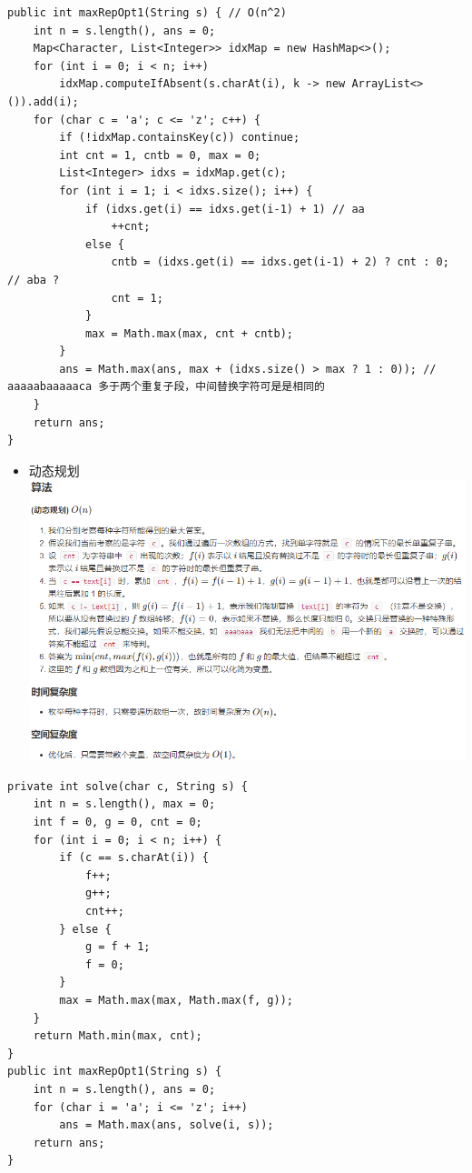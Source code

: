 \documentclass[9pt, b5paaper]{book}
\begin{document}
\begin{verbatim}
public int maxRepOpt1(String s) { // O(n^2)
    int n = s.length(), ans = 0;
    Map<Character, List<Integer>> idxMap = new HashMap<>();
    for (int i = 0; i < n; i++) 
        idxMap.computeIfAbsent(s.charAt(i), k -> new ArrayList<>()).add(i);
    for (char c = 'a'; c <= 'z'; c++) {
        if (!idxMap.containsKey(c)) continue;
        int cnt = 1, cntb = 0, max = 0;
        List<Integer> idxs = idxMap.get(c);
        for (int i = 1; i < idxs.size(); i++) {
            if (idxs.get(i) == idxs.get(i-1) + 1) // aa
                ++cnt;
            else {
                cntb = (idxs.get(i) == idxs.get(i-1) + 2) ? cnt : 0; // aba ?
                cnt = 1;
            }
            max = Math.max(max, cnt + cntb);
        }
        ans = Math.max(ans, max + (idxs.size() > max ? 1 : 0)); // aaaaabaaaaaca 多于两个重复子段，中间替换字符可是是相同的
    }
    return ans;
}
\end{verbatim}
\begin{itemize}
\item 动态规划
\includegraphics[width=.9\linewidth]{./pic/ssrepeat.png}
\end{itemize}
\begin{verbatim}
private int solve(char c, String s) {
    int n = s.length(), max = 0;
    int f = 0, g = 0, cnt = 0;
    for (int i = 0; i < n; i++) {
        if (c == s.charAt(i)) {
            f++;
            g++;
            cnt++;
        } else {
            g = f + 1;
            f = 0;
        }
        max = Math.max(max, Math.max(f, g));
    }
    return Math.min(max, cnt);
}
public int maxRepOpt1(String s) {
    int n = s.length(), ans = 0;
    for (char i = 'a'; i <= 'z'; i++) 
        ans = Math.max(ans, solve(i, s));
    return ans;
}
\end{verbatim}
\end{document}
